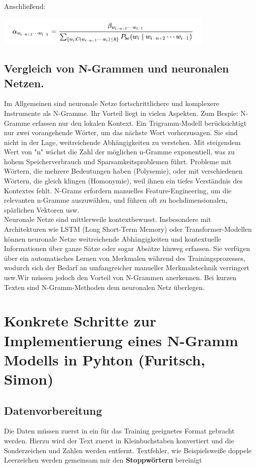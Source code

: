 \documentclass[12pt]{article}
\begin{document}
Anschließend:

\begin{center}
	\includegraphics[width=0.8\textwidth]{statics/Borisov/11.PNG}
\end{center}

\subsection{Vergleich von N-Grammen und neuronalen Netzen.}
\quad Im Allgemeinen sind neuronale Netze fortschrittlichere und komplexere Instrumente als N-Gramme. Ihr Vorteil liegt in vielen Aspekten. Zum Bespie: N-Gramme erfassen nur den lokalen Kontext. Ein Trigramm-Modell berücksichtigt nur zwei vorangehende Wörter, um das nächste Wort vorherzusagen. Sie sind nicht in der Lage, weitreichende Abhängigkeiten zu verstehen. Mit steigendem Wert von "n" wächst die Zahl der möglichen n-Gramme exponentiell, was zu hohem Speicherverbrauch und Sparsamkeitsproblemen führt. Probleme mit Wörtern, die mehrere Bedeutungen haben (Polysemie), oder mit verschiedenen Wörtern, die gleich klingen (Homonymie), weil ihnen ein tiefes Verständnis des Kontextes fehlt. N-Grams erfordern manuelles Feature-Engineering, um die relevanten n-Gramme auszuwählen, und führen oft zu hochdimensionalen, spärlichen Vektoren usw. \cite{roshmita2023} \cite{clarkGiorgoloLappin}
\\
\quad Neuronale Netze sind mittlerweile kontextbewusst. Insbesondere mit Architekturen wie LSTM (Long Short-Term Memory) oder Transformer-Modellen können neuronale Netze weitreichende Abhängigkeiten und kontextuelle Informationen über ganze Sätze oder sogar Absätze hinweg erfassen. Sie verfügen über ein automatisches Lernen von Merkmalen während des Trainingsprozesses, wodurch sich der Bedarf an umfangreicher manueller Merkmalstechnik verringert usw.Wir müssen jedoch den Vorteil von N-Grammen anerkennen. Bei kurzen Texten sind N-Gramm-Methoden dem neuronalen Netz überlegen.
\cite{babukumar2010}

\section{Konkrete Schritte zur Implementierung eines N-Gramm Modells in Pyhton (Furitsch, Simon)}
\subsection{Datenvorbereitung}
\quad Die Daten müssen zuerst in ein für das Training geeignetes Format gebracht werden. Hierzu wird der Text zuerst in Kleinbuchstaben konvertiert und die Sonderzeichen und Zahlen werden entfernt. Textfehler, wie Beispielsweiße doppele Leerzeichen werden gemeinsam mir den \textbf{Stoppwörtern} bereinigt
\end{document}

